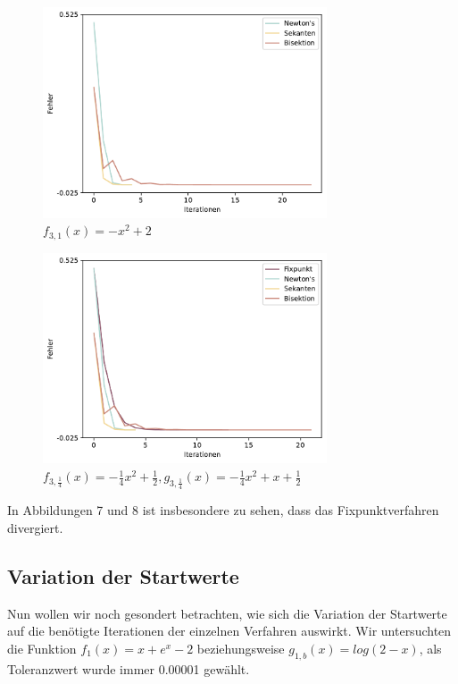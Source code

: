 \documentclass[a4paper,12pt]{article}
\newcommand{\1}{1\hspace{-0,9ex}1}
\begin{document}
\begin{figure}[H]
	\centering
	\includegraphics[width=0.75\textwidth]{plots/error_series_plot(3).pdf}
	\caption{$f_{3,1}(x) = -x^2 + 2$}
\end{figure}

\begin{figure}[H]
	\centering
	\includegraphics[width=0.75\textwidth]{plots/error_series_plot(4).pdf}
	\caption{$f_{3,\frac{1}{4}}(x) = -\frac{1}{4}x^2 +\frac{1}{2},  g_{3,\frac{1}{4}}(x)=-\frac{1}{4}x^2 + x + \frac{1}{2}$}
\end{figure}

In Abbildungen 7 und 8 ist insbesondere zu sehen, dass das Fixpunktverfahren divergiert.

\newpage
\subsection*{Variation der Startwerte}
Nun wollen wir noch gesondert betrachten, wie sich die Variation der Startwerte auf die benötigte Iterationen der einzelnen Verfahren auswirkt. Wir untersuchten die Funktion $f_1(x)=x+e^x-2$ beziehungsweise $g_{1,b}(x)=log(2-x)$, als Toleranzwert wurde immer 0.00001 gewählt.
\end{document}
